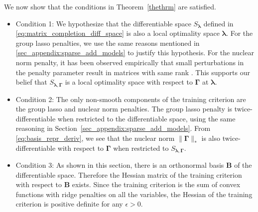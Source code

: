 \documentclass[12pt,letterpaper]{article}
\begin{document}
We now show that the conditions in Theorem~\ref{thethrm} are satisfied. 
\begin{itemize}
	\item[] Condition 1: We hypothesize that the differentiable space $S_{\boldsymbol{\lambda}}$ defined in \eqref{eq:matrix_completion_diff_space} is also a local optimality space $\boldsymbol{\lambda}$. For the group lasso penalties, we use the same reasons mentioned in \ref{sec_appendix:sparse_add_models} to justify this hypothesis. For the nuclear norm penalty, it has been observed empirically that small perturbations in the penalty parameter result in matrices with same rank \citep{mazumder2010spectral}. This supports our belief that $S_{\boldsymbol{\lambda}, \boldsymbol{\Gamma}}$ is a local optimality space with respect to $\boldsymbol{\Gamma}$ at $\boldsymbol{\lambda}$.
	\item[] Condition 2: The only non-smooth components of the training criterion are the group lasso and nuclear norm penalties. The group lasso penalty is twice-differentiable when restricted to the differentiable space, using the same reasoning in Section~\ref{sec_appendix:sparse_add_models}. From \eqref{eq:basis_repr_deriv}, we see that the nuclear norm $\|\boldsymbol{\Gamma}\|_{*}$ is also twice-differentiable with respect to $\boldsymbol{\Gamma}$ when restricted to $S_{\boldsymbol{\lambda}, \boldsymbol{\Gamma}}$.
	\hfill {}
	\item[] Condition 3: As shown in this section, there is an orthonormal basis $\boldsymbol{B}$ of the differentiable space. Therefore the Hessian matrix of the training criterion with respect to $\boldsymbol{B}$ exists. Since the training criterion is the sum of convex functions with ridge penalties on all the variables, the Hessian of the training criterion is positive definite for any $\epsilon > 0$.
	\hfill {}
\end{itemize}
\end{document}
